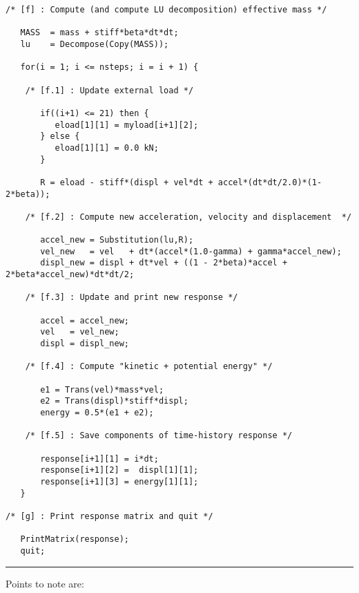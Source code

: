 \begin{footnotesize}
\begin{verbatim}
/* [f] : Compute (and compute LU decomposition) effective mass */

   MASS  = mass + stiff*beta*dt*dt;
   lu    = Decompose(Copy(MASS));

   for(i = 1; i <= nsteps; i = i + 1) {

    /* [f.1] : Update external load */

       if((i+1) <= 21) then {
          eload[1][1] = myload[i+1][2];
       } else {
          eload[1][1] = 0.0 kN;
       } 

       R = eload - stiff*(displ + vel*dt + accel*(dt*dt/2.0)*(1-2*beta));

    /* [f.2] : Compute new acceleration, velocity and displacement  */

       accel_new = Substitution(lu,R); 
       vel_new   = vel   + dt*(accel*(1.0-gamma) + gamma*accel_new);
       displ_new = displ + dt*vel + ((1 - 2*beta)*accel + 2*beta*accel_new)*dt*dt/2;

    /* [f.3] : Update and print new response */

       accel = accel_new;
       vel   = vel_new;
       displ = displ_new;

    /* [f.4] : Compute "kinetic + potential energy" */

       e1 = Trans(vel)*mass*vel;
       e2 = Trans(displ)*stiff*displ;
       energy = 0.5*(e1 + e2);

    /* [f.5] : Save components of time-history response */

       response[i+1][1] = i*dt;
       response[i+1][2] =  displ[1][1];
       response[i+1][3] = energy[1][1];
   }

/* [g] : Print response matrix and quit */

   PrintMatrix(response);
   quit;
\end{verbatim}
\rule{6.25 in}{0.035 in}
\end{footnotesize}

\vspace{0.15 in}\noindent
Points to note are:

